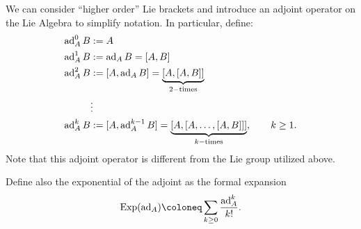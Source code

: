 We can consider ``higher order'' Lie brackets and introduce an adjoint operator on the Lie Algebra to simplify notation.  In particular, define:
\begin{equation}
  \begin{aligned}
    \operatorname{ad}_A^0 B & : = A                                                                                                              \\
    \operatorname{ad}_A^1 B & : = \operatorname{ad}_A B = [A,B]                                                                                          \\
    \operatorname{ad}_A^2 B & : =[A,  \operatorname{ad}_A B] = \underbrace{[A,[A,B]]}_{2-\mathrm{times}}                                             \\
                  & \vdots                                                                                                               \\
    \operatorname{ad}_A^k B & := [A, \operatorname{ad}_A^{k - 1} B] = \underbrace{[A, [ A , \ldots, [A,B]]]}_{k-\mathrm{times}} , \qquad k \geq 1.
  \end{aligned}
\end{equation}
Note that this adjoint operator is different from the Lie group utilized above.

Define also the exponential of the adjoint as the formal expansion
\begin{equation}
  \label{eq:adjoint_exponential}
  \Exp(\ad_\lx) \coloneq \sum_{k \geq 0} \frac{\ad_\lx^k}{k!}.
\end{equation}

